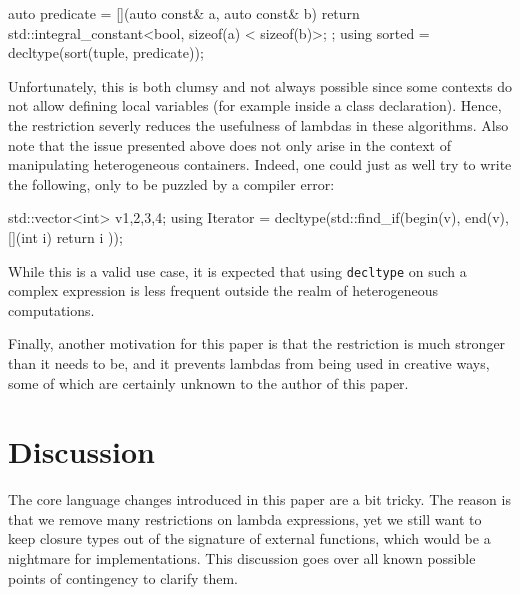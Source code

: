 \documentclass{wg21}
\newcommand{\cc}[1]{\texttt{#1}}
\begin{document}
\begin{cpp}
auto predicate = [](auto const& a, auto const& b) {
  return std::integral_constant<bool, sizeof(a) < sizeof(b)>{};
};
using sorted = decltype(sort(tuple, predicate));
\end{cpp}

Unfortunately, this is both clumsy and not always possible since some contexts
do not allow defining local variables (for example inside a class declaration).
Hence, the restriction severly reduces the usefulness of lambdas in these algorithms.
Also note that the issue presented above does not only arise in the context of
manipulating heterogeneous containers. Indeed, one could just as well try to
write the following, only to be puzzled by a compiler error:

\begin{cpp}
std::vector<int> v{1,2,3,4};
using Iterator = decltype(std::find_if(begin(v), end(v), [](int i) {
  return i %
}));
\end{cpp}

While this is a valid use case, it is expected that using \cc{decltype} on
such a complex expression is less frequent outside the realm of heterogeneous
computations.

Finally, another motivation for this paper is that the restriction is much stronger
than it needs to be, and it prevents lambdas from being used in creative ways,
some of which are certainly unknown to the author of this paper.


\section{Discussion}
The core language changes introduced in this paper are a bit tricky. The reason
is that we remove many restrictions on lambda expressions, yet we still want to
keep closure types out of the signature of external functions, which would be
a nightmare for implementations. This discussion goes over all known possible
points of contingency to clarify them.
\end{document}
